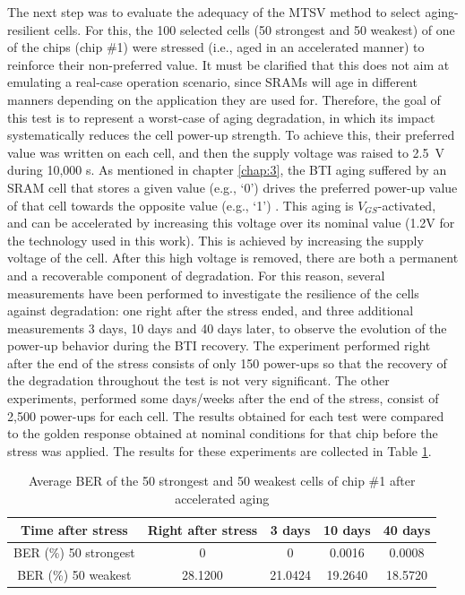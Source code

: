 The next step was to evaluate the adequacy of the MTSV method to select aging-resilient cells. For this, the 100 selected cells (50 strongest and 50 weakest) of one of the chips (chip \#1) were stressed (i.e., aged in an accelerated manner) to reinforce their non-preferred value. It must be clarified that this does not aim at emulating a real-case operation scenario, since SRAMs will age in different manners depending on the application they are used for. Therefore, the goal of this test is to represent a worst-case of aging degradation, in which its impact systematically reduces the cell power-up strength. To achieve this, their preferred value was written on each cell, and then the supply voltage was raised to \SI{2.5}{V} during 10,000 s. As mentioned in chapter \ref{chap:3}, the BTI aging suffered by an SRAM cell that stores a given value (e.g., ‘0’) drives the preferred power-up value of that cell towards the opposite value (e.g., ‘1’) \cite{Bhargava2012}. This aging is $V_{GS}$-activated, and can be accelerated by increasing this voltage over its nominal value (1.2V for the technology used in this work). This is achieved by increasing the supply voltage of the cell. After this high voltage is removed, there are both a permanent and a recoverable component of degradation. For this reason, several measurements have been performed to investigate the resilience of the cells against degradation: one right after the stress ended, and three additional measurements 3 days, 10 days and 40 days later, to observe the evolution of the power-up behavior during the BTI recovery. The experiment performed right after the end of the stress consists of only 150 power-ups so that the recovery of the degradation throughout the test is not very significant. The other experiments, performed some days/weeks after the end of the stress, consist of 2,500 power-ups for each cell. The results obtained for each test were compared to the golden response obtained at nominal conditions for that chip before the stress was applied. The results for these experiments are collected in Table \ref{tab:aging_ave_BER}.

\begin{table}[H]
  \centering
  \caption{Average BER of the 50 strongest and 50 weakest cells of chip \#1 after accelerated aging}
  
  \vspace{5mm}
    \begin{tabular}{|c|c|c|c|c|}
    \hline
     Time after stress & Right after stress & 3 days & 10 days & 40 days \bigstrut\\
    \hline
    BER (\%) 50 strongest & 0 & 0 & 0.0016 & 0.0008 \bigstrut\\
    \hline
    BER (\%) 50 weakest & 28.1200 & 21.0424 & 19.2640 & 18.5720 \bigstrut\\
    \hline
    \end{tabular}%
  \label{tab:aging_ave_BER}%
\end{table}%

